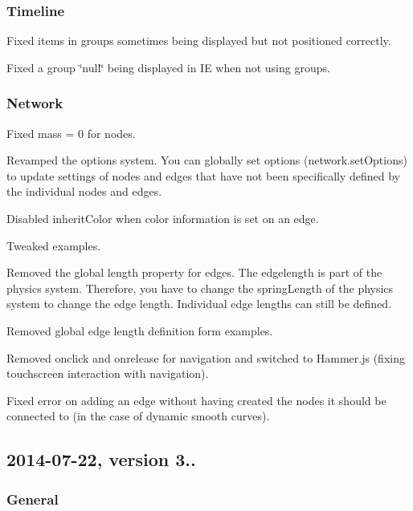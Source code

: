 \subsubsection*{Timeline}


\begin{DoxyItemize}
\item Fixed items in groups sometimes being displayed but not positioned correctly.
\item Fixed a group \char`\"{}null\char`\"{} being displayed in IE when not using groups.
\end{DoxyItemize}

\subsubsection*{Network}


\begin{DoxyItemize}
\item Fixed mass = 0 for nodes.
\item Revamped the options system. You can globally set options (network.\+set\+Options) to update settings of nodes and edges that have not been specifically defined by the individual nodes and edges.
\item Disabled inherit\+Color when color information is set on an edge.
\item Tweaked examples.
\item Removed the global length property for edges. The edgelength is part of the physics system. Therefore, you have to change the spring\+Length of the physics system to change the edge length. Individual edge lengths can still be defined.
\item Removed global edge length definition form examples.
\item Removed onclick and onrelease for navigation and switched to Hammer.\+js (fixing touchscreen interaction with navigation).
\item Fixed error on adding an edge without having created the nodes it should be connected to (in the case of dynamic smooth curves).
\end{DoxyItemize}

\subsection*{2014-\/07-\/22, version 3..}

\subsubsection*{General}


